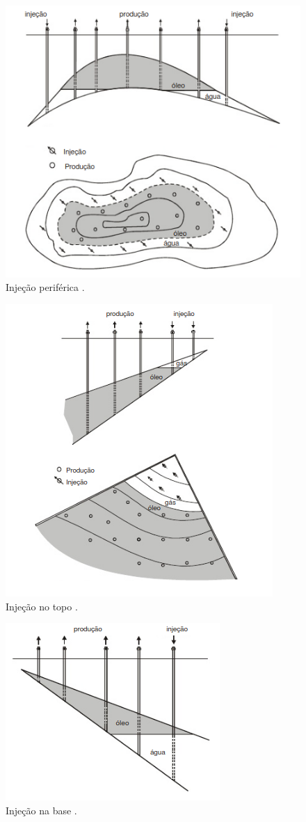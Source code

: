 \begin{figure}[!ht]
\centering
\includegraphics[width=.6\textwidth]{figs/revisao/revisao_injper.png}
\caption{Inje\c{c}\~{a}o perif\'{e}rica \cite[p. 565]{engres}.}
\label{fig:rev_injper}
\end{figure}

\begin{figure}[!ht]
\centering
\includegraphics[width=.6\textwidth]{figs/revisao/revisao_injtop.png}
\caption{Inje\c{c}\~{a}o no topo \cite[p. 566]{engres}.}
\label{fig:rev_injtop}
\end{figure}

\begin{figure}[!ht]
\centering
\includegraphics[width=.6\textwidth]{figs/revisao/revisao_injbas.png}
\caption{Inje\c{c}\~{a}o na base \cite[p. 566]{engres}.}
\label{fig:rev_injbas}
\end{figure}





